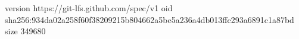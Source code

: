version https://git-lfs.github.com/spec/v1
oid sha256:934da02a258f60f38209215b804662a5be5a236a4db013ffc293a6891c1a87bd
size 349680
